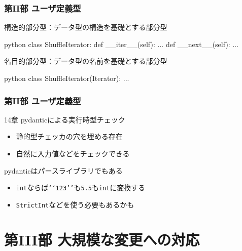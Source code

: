 \documentclass[aspectratio=169,dvipdfmx,12pt,notheorems]{beamer}
\theoremstyle{definition}
\begin{document}
\begin{frame}[fragile]\frametitle{第II部 ユーザ定義型}

\begin{exampleblock}{構造的部分型：データ型の構造を基礎とする部分型}
\begin{pygments}{python}
class ShuffleIterator:  
    def __iter__(self):
        ...
    def __next__(self):
        ...
\end{pygments}
\end{exampleblock}

\begin{exampleblock}{名目的部分型：データ型の名前を基礎とする部分型}
\begin{pygments}{python}
class ShuffleIterator(Iterator):  
        ...
\end{pygments}
\end{exampleblock}
\end{frame}

\begin{frame}\frametitle{第II部 ユーザ定義型}

\begin{block}{14章 pydanticによる実行時型チェック}
\begin{itemize}
\item 静的型チェッカの穴を埋める存在
\item 自然に入力値などをチェックできる
\end{itemize}
\end{block}

\begin{alertblock}{pydanticはパースライブラリでもある}
\begin{itemize}
\item \texttt{int}ならば\texttt{\lq\lq{}123\rq\rq{}}も\texttt{5.5}も\texttt{int}に変換する
\item \texttt{StrictInt}などを使う必要もあるかも
\end{itemize}
\end{alertblock}

\end{frame}

\section{第III部 大規模な変更への対応}
\end{document}
